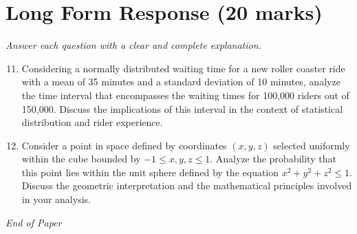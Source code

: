 \documentclass[12pt]{article}
\begin{document}
\section*{Long Form Response (20 marks)}
\textit{Answer each question with a clear and complete explanation.}
\begin{enumerate}[label=\arabic*.]
\setcounter{enumi}{10}
\item Considering a normally distributed waiting time for a new roller coaster ride with a mean of 35 minutes and a standard deviation of 10 minutes, analyze the time interval that encompasses the waiting times for 100,000 riders out of 150,000. Discuss the implications of this interval in the context of statistical distribution and rider experience.
\item Consider a point in space defined by coordinates \((x,y,z)\) selected uniformly within the cube bounded by \(-1 \leq x, y, z \leq 1\). Analyze the probability that this point lies within the unit sphere defined by the equation \(x^2 + y^2 + z^2 \leq 1\). Discuss the geometric interpretation and the mathematical principles involved in your analysis.
\end{enumerate}

\vfill
\noindent\textit{End of Paper}
\end{document}
